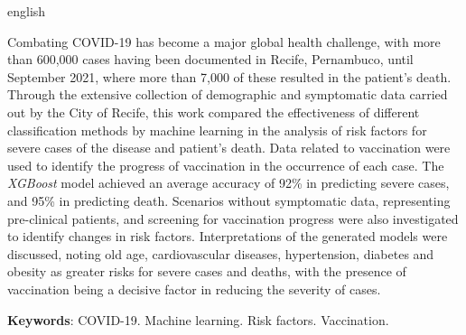 \begin{resumo}[Abstract]
\begin{otherlanguage*}{english}

Combating COVID-19 has become a major global health challenge, with more than 600,000 cases having been documented in Recife, Pernambuco, until September 2021, where more than 7,000 of these resulted in the patient's death. Through the extensive collection of demographic and symptomatic data carried out by the City of Recife, this work compared the effectiveness of different classification methods by machine learning in the analysis of risk factors for severe cases of the disease and patient's death. Data related to vaccination were used to identify the progress of vaccination in the occurrence of each case. The \textit{XGBoost} model achieved an average accuracy of 92\% in predicting severe cases, and 95\% in predicting death. Scenarios without symptomatic data, representing pre-clinical patients, and screening for vaccination progress were also investigated to identify changes in risk factors. Interpretations of the generated models were discussed, noting old age, cardiovascular diseases, hypertension, diabetes and obesity as greater risks for severe cases and deaths, with the presence of vaccination being a decisive factor in reducing the severity of cases.



   \vspace{\onelineskip} 
 
   \noindent 
   \textbf{Keywords}: COVID-19. Machine learning. Risk factors. Vaccination. 
 \end{otherlanguage*}
 \end{resumo}
